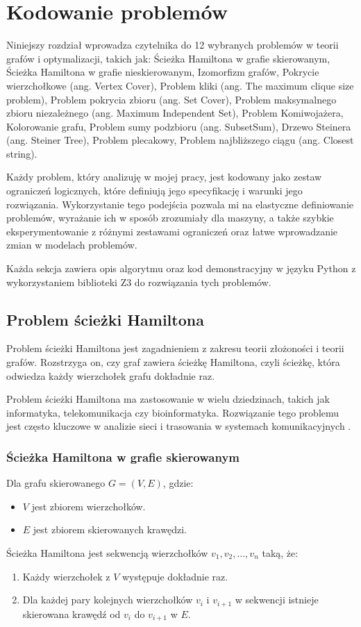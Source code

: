 \chapter{Kodowanie problemów}

Niniejszy rozdział wprowadza czytelnika do 12 wybranych problemów w teorii grafów i optymalizacji, takich jak:
Ścieżka Hamiltona w grafie skierowanym,
Ścieżka Hamiltona w grafie nieskierowanym, 
Izomorfizm grafów, 
Pokrycie wierzchołkowe (ang. Vertex Cover), 
Problem kliki (ang. The maximum clique size problem), 
Problem pokrycia zbioru (ang. Set Cover), 
Problem maksymalnego zbioru niezależnego (ang. Maximum Independent Set), 
Problem Komiwojażera, 
Kolorowanie grafu, 
Problem sumy podzbioru (ang. SubsetSum), 
Drzewo Steinera (ang. Steiner Tree), 
Problem plecakowy, 
Problem najbliższego ciągu (ang. Closest string).

Każdy problem, który analizuję w mojej pracy, jest kodowany jako zestaw ograniczeń logicznych, które definiują jego specyfikację i warunki jego rozwiązania. Wykorzystanie tego podejścia pozwala mi na elastyczne definiowanie problemów, wyrażanie ich w sposób zrozumiały dla maszyny, a także szybkie eksperymentowanie z różnymi zestawami ograniczeń oraz łatwe wprowadzanie zmian w modelach problemów.

Każda sekcja zawiera opis algorytmu oraz kod demonstracyjny w języku Python z wykorzystaniem biblioteki Z3 do rozwiązania tych problemów.

\section{Problem ścieżki Hamiltona}

Problem ścieżki Hamiltona jest zagadnieniem z zakresu teorii złożoności i teorii grafów. Rozstrzyga on, czy graf zawiera ścieżkę Hamiltona, czyli ścieżkę, która odwiedza każdy wierzchołek grafu dokładnie raz.

Problem ścieżki Hamiltona ma zastosowanie w wielu dziedzinach, takich jak informatyka, telekomunikacja czy bioinformatyka. Rozwiązanie tego problemu jest często kluczowe w analizie sieci i trasowania w systemach komunikacyjnych \cite{enwiki:1190136070}.

\subsection{Ścieżka Hamiltona w grafie skierowanym}

Dla grafu skierowanego $G = (V, E)$, gdzie:
\begin{itemize}
	\item \(V\) jest zbiorem wierzchołków.
	\item \(E\) jest zbiorem skierowanych krawędzi.
\end{itemize}
Ścieżka Hamiltona jest sekwencją wierzchołków $v_1, v_2, …, v_n$ taką, że:
\begin{enumerate}
	\item Każdy wierzchołek z \(V\) występuje dokładnie raz.
	\item Dla każdej pary kolejnych wierzchołków \(v_i\) i \(v_{i+1}\) w sekwencji istnieje skierowana krawędź od \(v_i\) do \(v_{i+1}\) w \(E\). 
\end{enumerate}

